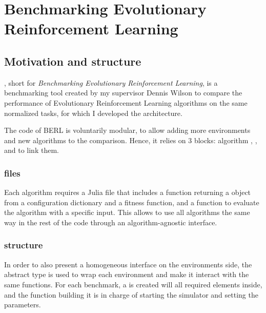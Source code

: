 \chapter{Benchmarking Evolutionary Reinforcement Learning}
\label{chap:berl}

\section{Motivation and structure}

, short for \textit{Benchmarking Evolutionary Reinforcement Learning}, is a benchmarking tool created by my supervisor Dennis Wilson to compare the performance of Evolutionary Reinforcement Learning algorithms on the same normalized tasks, for which I developed the architecture. 

The code of BERL is voluntarily modular, to allow adding more environments and new algorithms to the comparison. Hence, it relies on 3 blocks: algorithm , , and  to link them.

\subsection{ files}

Each algorithm requires a  Julia file that includes a function returning a  object from a configuration dictionary and a fitness function, and a  function to evaluate the algorithm with a specific input. This allows to use all algorithms the same way in the rest of the code through an algorithm-agnostic interface. 


\subsection{ structure}

In order to also present a homogeneous interface on the environments side, the  abstract type is used to wrap each environment and make it interact with the same functions. For each benchmark, a  is created will all required elements inside, and the function building it is in charge of starting the simulator and setting the parameters.

